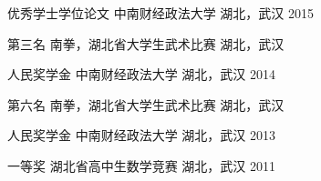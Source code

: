 \begin{cvhonors}



\cvhonor
{优秀学士学位论文} %
{中南财经政法大学} %
{湖北，武汉} %
{2015} %



\cvhonor
{第三名} %
{南拳，湖北省大学生武术比赛} %
{湖北，武汉} %
{ } %


\cvhonor
{人民奖学金} %
{中南财经政法大学} %
{湖北，武汉} %
{2014} %


\cvhonor
{第六名} %
{南拳，湖北省大学生武术比赛} %
{湖北，武汉} %
{ } %


\cvhonor
{人民奖学金} %
{中南财经政法大学} %
{湖北，武汉} %
{2013} %


\cvhonor
{一等奖} %
{湖北省高中生数学竞赛} %
{湖北，武汉} %
{2011} %

\end{cvhonors}